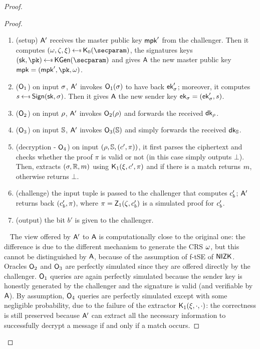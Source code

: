 \begin{proof}
\begin{lemma}
\begin{proof}
            \begin{enumerate}
                \item (setup) $\mathsf{A}'$ receives the master public key $\mathsf{mpk}'$ from the challenger. Then it computes $(\crs,\tpsim,\tpext)\getsr\nizkext_0(\secparam)$, the signatures keys $(\sk, \pk) \getsr \kgen(\secparam)$ and gives $\mathsf{A}$ the new master public key $\mpk = (\mpk', \pk, \crs)$.
                \item ($\mathsf{O}_1$) on input $\sigma$, $\mathsf{A}'$ invokes $\mathsf{O}_1(\sigma)$ to have back $\mathsf{ek}'_\sigma$; moreover, it computes $\signature \getsr \sign(\sk, \sattr)$. Then it gives $\mathsf{A}$ the new sender key $\mathsf{ek}_\sigma = (\mathsf{ek}'_\sigma, s)$.
                \item ($\mathsf{O}_2$) on input $\rho$, $\mathsf{A}'$ invokes $\mathsf{O}_2(\rho)$ and forwards the received $\mathsf{dk}_\rho$.
                \item ($\mathsf{O}_3$) on input $\mathbb{S}$, $\mathsf{A}'$ invokes $\mathsf{O}_3(\mathbb{S})$ and simply forwards the received $\mathsf{dk}_{\mathbb{S}}$.
                \item (decryption - $\mathsf{O}_4$) on input $(\rho, \mathbb{S}, (c', \pi))$, it first parses the ciphertext and checks whether the proof $\pi$ is valid or not (in this case simply outputs $\bot$). Then, extracts $(\sigma, \mathbb{R}, m)$ using $\mathsf{K}_1(\xi,c',\pi)$ and if there is a match returns $m$, otherwise returns $\bot$.
                \item (challenge) the input tuple is passed to the challenger that computes $c'_b$; $\mathsf{A}'$ returns back $(c'_b, \pi)$, where $\pi = \mathsf{Z}_1(\zeta, c'_b)$ is a simulated proof for $c'_b$.
                \item (output) the bit $b'$ is given to the challenger.
            \end{enumerate}
            ~\newline
            The view offered by $\mathsf{A}'$ to $\mathsf{A}$ is computationally close to the original one: the difference is due to the different mechanism to generate the CRS $\omega$, but this cannot be distinguished by $\mathsf{A}$, because of the assumption of f-tSE of $\mathsf{NIZK}$.
            Oracles $\mathsf{O}_2$ and $\mathsf{O}_3$ are perfectly simulated since they are offered directly by the challenger.
            $\mathsf{O}_1$ queries are again perfectly simulated because the sender key is honestly generated by the challenger and the signature is valid (and verifiable by $\mathsf{A}$).
            By assumption, $\mathsf{O}_4$ queries are perfectly simulated except with some negligible probability, due to the failure of the extractor $\mathsf{K}_1(\xi, \cdot, \cdot)$: the correctness is still preserved because $\mathsf{A}'$ can extract all the necessary information to successfully decrypt a message if and only if a match occurs.
        \end{proof}
    \end{lemma}


\end{proof}

